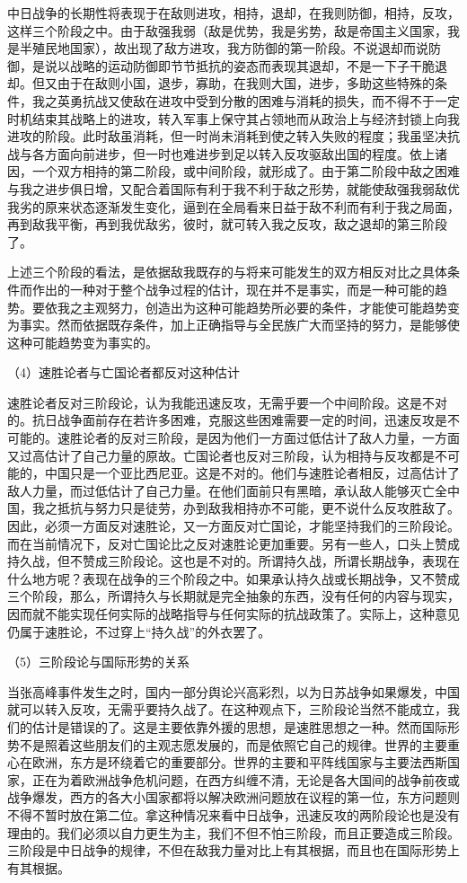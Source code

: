 \documentclass[UTF8, 12pt, a4paper]{ctexrep}
\begin{document}
中日战争的长期性将表现于在敌则进攻，相持，退却，在我则防御，相持，反攻，这样三个阶段之中。由于敌强我弱（敌是优势，我是劣势，敌是帝国主义国家，我是半殖民地国家），故出现了敌方进攻，我方防御的第一阶段。不说退却而说防御，是说以战略的运动防御即节节抵抗的姿态而表现其退却，不是一下子干脆退却。但又由于在敌则小国，退步，寡助，在我则大国，进步，多助这些特殊的条件，我之英勇抗战又使敌在进攻中受到分散的困难与消耗的损失，而不得不于一定时机结束其战略上的进攻，转入军事上保守其占领地而从政治上与经济封锁上向我进攻的阶段。此时敌虽消耗，但一时尚未消耗到使之转入失败的程度；我虽坚决抗战与各方面向前进步，但一时也难进步到足以转入反攻驱敌出国的程度。依上诸因，一个双方相持的第二阶段，或中间阶段，就形成了。由于第二阶段中敌之困难与我之进步俱日增，又配合着国际有利于我不利于敌之形势，就能使敌强我弱敌优我劣的原来状态逐渐发生变化，逼到在全局看来日益于敌不利而有利于我之局面，再到敌我平衡，再到我优敌劣，彼时，就可转入我之反攻，敌之退却的第三阶段了。

上述三个阶段的看法，是依据敌我既存的与将来可能发生的双方相反对比之具体条件而作出的一种对于整个战争过程的估计，现在并不是事实，而是一种可能的趋势。要依我之主观努力，创造出为这种可能趋势所必要的条件，才能使可能趋势变为事实。然而依据既存条件，加上正确指导与全民族广大而坚持的努力，是能够使这种可能趋势变为事实的。

（4）速胜论者与亡国论者都反对这种估计

速胜论者反对三阶段论，认为我能迅速反攻，无需乎要一个中间阶段。这是不对的。抗日战争面前存在若许多困难，克服这些困难需要一定的时间，迅速反攻是不可能的。速胜论者的反对三阶段，是因为他们一方面过低估计了敌人力量，一方面又过高估计了自己力量的原故。亡国论者也反对三阶段，认为相持与反攻都是不可能的，中国只是一个亚比西尼亚。这是不对的。他们与速胜论者相反，过高估计了敌人力量，而过低估计了自己力量。在他们面前只有黑暗，承认敌人能够灭亡全中国，我之抵抗与努力只是徒劳，办到敌我相持亦不可能，更不说什么反攻胜敌了。因此，必须一方面反对速胜论，又一方面反对亡国论，才能坚持我们的三阶段论。而在当前情况下，反对亡国论比之反对速胜论更加重要。另有一些人，口头上赞成持久战，但不赞成三阶段论。这也是不对的。所谓持久战，所谓长期战争，表现在什么地方呢？表现在战争的三个阶段之中。如果承认持久战或长期战争，又不赞成三个阶段，那么，所谓持久与长期就是完全抽象的东西，没有任何的内容与现实，因而就不能实现任何实际的战略指导与任何实际的抗战政策了。实际上，这种意见仍属于速胜论，不过穿上“持久战”的外衣罢了。

（5）三阶段论与国际形势的关系

当张高峰事件发生之时，国内一部分舆论兴高彩烈，以为日苏战争如果爆发，中国就可以转入反攻，无需乎要持久战了。在这种观点下，三阶段论当然不能成立，我们的估计是错误的了。这是主要依靠外援的思想，是速胜思想之一种。然而国际形势不是照着这些朋友们的主观志愿发展的，而是依照它自己的规律。世界的主要重心在欧洲，东方是环绕着它的重要部分。世界的主要和平阵线国家与主要法西斯国家，正在为着欧洲战争危机问题，在西方纠缠不清，无论是各大国间的战争前夜或战争爆发，西方的各大小国家都将以解决欧洲问题放在议程的第一位，东方问题则不得不暂时放在第二位。拿这种情况来看中日战争，迅速反攻的两阶段论也是没有理由的。我们必须以自力更生为主，我们不但不怕三阶段，而且正要造成三阶段。三阶段是中日战争的规律，不但在敌我力量对比上有其根据，而且也在国际形势上有其根据。
\end{document}
